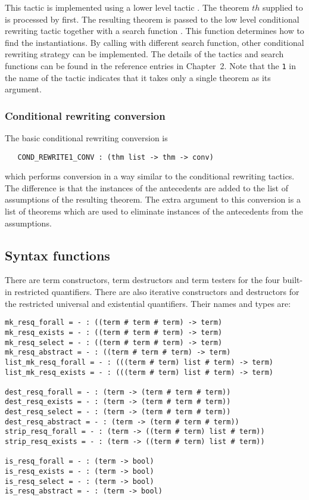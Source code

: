 This tactic is implemented using a lower level tactic .
The theorem $th$ supplied to  is processed by
 first. The resulting theorem is passed to the low
level conditional rewriting tactic  together with a
search function . This function determines how to
find the instantiations. By calling  with different
search function, other conditional rewriting strategy can be
implemented. The details of the tactics and search functions can be
found in the reference entries in Chapter~2.
Note that the {\tt 1} in the name of the tactic indicates that it
takes only a single theorem as its argument.

\subsubsection{Conditional rewriting conversion}

The basic conditional rewriting conversion is
\begin{holboxed}
\begin{verbatim}
   COND_REWRITE1_CONV : (thm list -> thm -> conv)
\end{verbatim}
\end{holboxed}
which performs conversion in a way similar to the conditional
rewriting tactics. The difference is that the instances of the
antecedents are added to the list of assumptions of the resulting theorem. The
extra argument to this conversion is a list of theorems which are
used to eliminate instances of the antecedents from the assumptions.

\subsection{Syntax functions}

There are term constructors, term destructors and term testers for the
four built-in restricted quantifiers. There are also iterative
constructors and destructors for the restricted universal and
existential quantifiers. Their names and types are:
\begin{holboxed}
\begin{verbatim}
mk_resq_forall = - : ((term # term # term) -> term)
mk_resq_exists = - : ((term # term # term) -> term)
mk_resq_select = - : ((term # term # term) -> term)
mk_resq_abstract = - : ((term # term # term) -> term)
list_mk_resq_forall = - : (((term # term) list # term) -> term)
list_mk_resq_exists = - : (((term # term) list # term) -> term)

dest_resq_forall = - : (term -> (term # term # term))
dest_resq_exists = - : (term -> (term # term # term))
dest_resq_select = - : (term -> (term # term # term))
dest_resq_abstract = - : (term -> (term # term # term))
strip_resq_forall = - : (term -> ((term # term) list # term))
strip_resq_exists = - : (term -> ((term # term) list # term))

is_resq_forall = - : (term -> bool)
is_resq_exists = - : (term -> bool)
is_resq_select = - : (term -> bool)
is_resq_abstract = - : (term -> bool)
\end{verbatim}
\end{holboxed}

